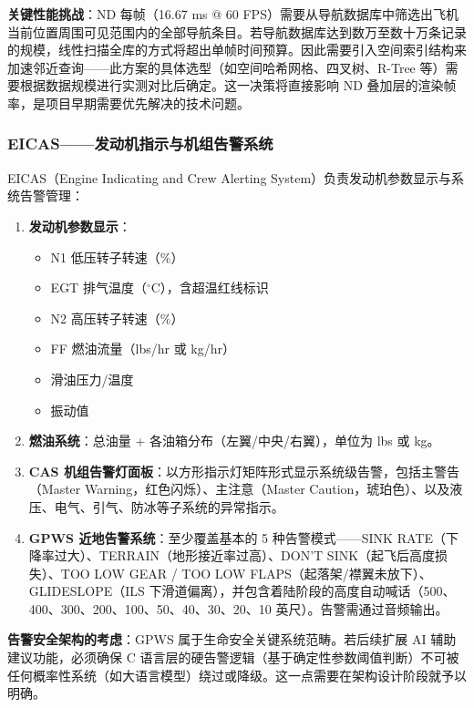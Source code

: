 \documentclass[12pt,a4paper]{ctexart}
\begin{document}
\textbf{关键性能挑战}：ND 每帧（16.67 ms @ 60 FPS）需要从导航数据库中筛选出飞机当前位置周围可见范围内的全部导航条目。若导航数据库达到数万至数十万条记录的规模，线性扫描全库的方式将超出单帧时间预算。因此需要引入空间索引结构来加速邻近查询——此方案的具体选型（如空间哈希网格、四叉树、R-Tree 等）需要根据数据规模进行实测对比后确定。这一决策将直接影响 ND 叠加层的渲染帧率，是项目早期需要优先解决的技术问题。

\subsubsection{EICAS——发动机指示与机组告警系统}

EICAS（Engine Indicating and Crew Alerting System）负责发动机参数显示与系统告警管理：

\begin{enumerate}[leftmargin=*]
    \item \textbf{发动机参数显示}：
    \begin{itemize}
        \item N1 低压转子转速（\%）
        \item EGT 排气温度（$^\circ$C），含超温红线标识
        \item N2 高压转子转速（\%）
        \item FF 燃油流量（lbs/hr 或 kg/hr）
        \item 滑油压力/温度
        \item 振动值
    \end{itemize}
    \item \textbf{燃油系统}：总油量 + 各油箱分布（左翼/中央/右翼），单位为 lbs 或 kg。
    \item \textbf{CAS 机组告警灯面板}：以方形指示灯矩阵形式显示系统级告警，包括主警告（Master Warning，红色闪烁）、主注意（Master Caution，琥珀色）、以及液压、电气、引气、防冰等子系统的异常指示。
    \item \textbf{GPWS 近地告警系统}：至少覆盖基本的 5 种告警模式——SINK RATE（下降率过大）、TERRAIN（地形接近率过高）、DON'T SINK（起飞后高度损失）、TOO LOW GEAR / TOO LOW FLAPS（起落架/襟翼未放下）、GLIDESLOPE（ILS 下滑道偏离），并包含着陆阶段的高度自动喊话（500、400、300、200、100、50、40、30、20、10 英尺）。告警需通过音频输出。
\end{enumerate}

\textbf{告警安全架构的考虑}：GPWS 属于生命安全关键系统范畴。若后续扩展 AI 辅助建议功能，必须确保 C 语言层的硬告警逻辑（基于确定性参数阈值判断）不可被任何概率性系统（如大语言模型）绕过或降级。这一点需要在架构设计阶段就予以明确。
\end{document}
